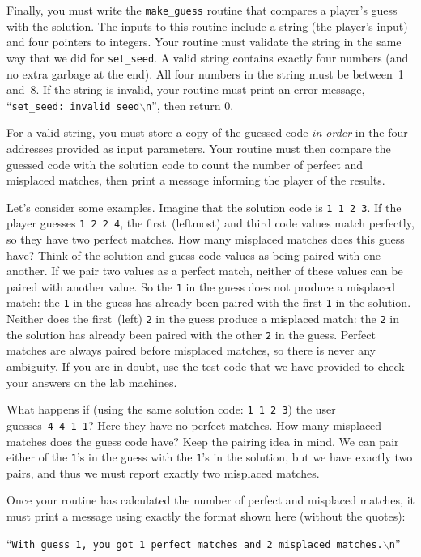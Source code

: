 Finally, you must write the {\tt make\_guess} routine that compares a
player's guess with the solution.  The inputs to this routine include
a string (the player's input) 
and four pointers to integers. 
%
Your routine must validate the string in the same way that we did for 
{\tt set\_seed}.  A valid string contains exactly four numbers (and no
extra garbage at the end).
All four numbers in the string must be between~1 and~8.
If the string is invalid, your routine must print an error
message, ``{\tt set\_seed:~invalid~seed$\backslash$n}'', then return 0.  

For a valid string, you must store a copy of the guessed code {\em in order}
in the four addresses provided as input parameters.
%
Your routine must then compare the guessed code with the solution code
to count the number of perfect and misplaced matches, then print a message
informing the player of the results.

Let's consider some examples.  Imagine that the solution code is {\tt 1~1~2~3}.
If the player guesses {\tt 1~2~2~4}, the first~(leftmost) and third code
values match perfectly, so they have two perfect matches.  How many
misplaced matches does this guess have?  Think of the solution and guess
code values as being paired with one another.  If we pair two values as 
a perfect match, neither of these values can be paired with another value.
So the {\tt 1} in the guess does not produce a misplaced match: the
{\tt 1} in the guess has
already been paired with the first {\tt 1} in the solution.  Neither does
the first~(left) {\tt 2} in the guess produce a misplaced match: the
{\tt 2} in the solution has already been paired with the other {\tt 2} 
in the guess.  Perfect matches are always paired before misplaced matches,
so there is never any ambiguity.  If you are in doubt, use the test code
that we have provided to check your answers on the lab machines.

What happens if (using the same solution code: {\tt 1~1~2~3}) the user
guesses~{\tt 4~4~1~1}?  Here they have no perfect matches.  How many
misplaced matches does the guess code have?  Keep the pairing idea in
mind.  We can pair either of the {\tt 1}'s in the guess with the {\tt 1}'s
in the solution, but we have exactly two pairs, and thus we must report
exactly two misplaced matches.

Once your routine has calculated the number of perfect and misplaced
matches, it must print a message using exactly the format shown here
(without the quotes):

\protect{\mbox{\hspace{.25in}}}%
``{\tt With guess 1, you got 1 perfect matches and 2 misplaced matches.$\backslash$n}''

